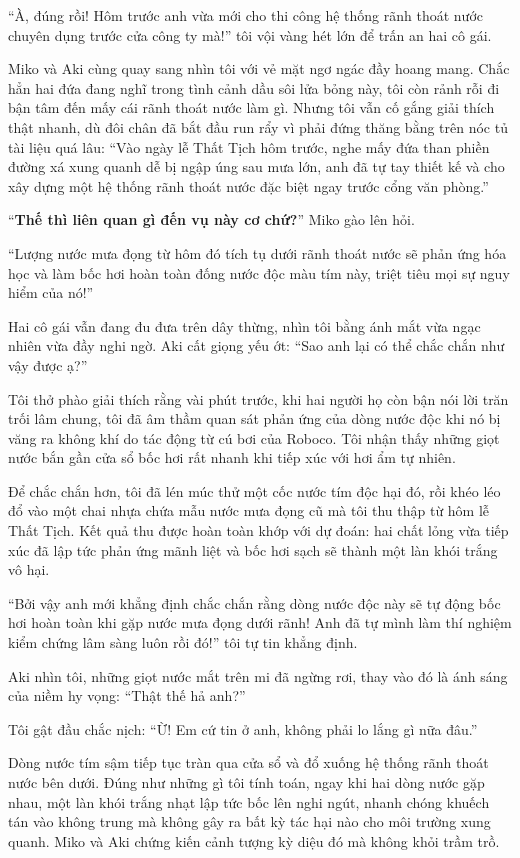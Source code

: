 \documentclass[../main.tex]{subfiles}
\begin{document}
``À, đúng rồi! Hôm trước anh vừa mới cho thi công hệ thống rãnh thoát nước chuyên dụng trước cửa công ty mà!'' tôi vội vàng hét lớn để trấn an hai cô gái.

Miko và Aki cùng quay sang nhìn tôi với vẻ mặt ngơ ngác đầy hoang mang. Chắc hẳn hai đứa đang nghĩ trong tình cảnh dầu sôi lửa bỏng này, tôi còn rảnh rỗi đi bận tâm đến mấy cái rãnh thoát nước làm gì. Nhưng tôi vẫn cố gắng giải thích thật nhanh, dù đôi chân đã bắt đầu run rẩy vì phải đứng thăng bằng trên nóc tủ tài liệu quá lâu:
``Vào ngày lễ Thất Tịch hôm trước, nghe mấy đứa than phiền đường xá xung quanh dễ bị ngập úng sau mưa lớn, anh đã tự tay thiết kế và cho xây dựng một hệ thống rãnh thoát nước đặc biệt ngay trước cổng văn phòng.''

``\textbf{Thế thì liên quan gì đến vụ này cơ chứ?}'' Miko gào lên hỏi.

``Lượng nước mưa đọng từ hôm đó tích tụ dưới rãnh thoát nước sẽ phản ứng hóa học và làm bốc hơi hoàn toàn đống nước độc màu tím này, triệt tiêu mọi sự nguy hiểm của nó!''

Hai cô gái vẫn đang đu đưa trên dây thừng, nhìn tôi bằng ánh mắt vừa ngạc nhiên vừa đầy nghi ngờ. Aki cất giọng yếu ớt:
``Sao anh lại có thể chắc chắn như vậy được ạ?''

Tôi thở phào giải thích rằng vài phút trước, khi hai người họ còn bận nói lời trăn trối lâm chung, tôi đã âm thầm quan sát phản ứng của dòng nước độc khi nó bị văng ra không khí do tác động từ cú bơi của Roboco. Tôi nhận thấy những giọt nước bắn gần cửa sổ bốc hơi rất nhanh khi tiếp xúc với hơi ẩm tự nhiên.

Để chắc chắn hơn, tôi đã lén múc thử một cốc nước tím độc hại đó, rồi khéo léo đổ vào một chai nhựa chứa mẫu nước mưa đọng cũ mà tôi thu thập từ hôm lễ Thất Tịch. Kết quả thu được hoàn toàn khớp với dự đoán: hai chất lỏng vừa tiếp xúc đã lập tức phản ứng mãnh liệt và bốc hơi sạch sẽ thành một làn khói trắng vô hại.

``Bởi vậy anh mới khẳng định chắc chắn rằng dòng nước độc này sẽ tự động bốc hơi hoàn toàn khi gặp nước mưa đọng dưới rãnh! Anh đã tự mình làm thí nghiệm kiểm chứng lâm sàng luôn rồi đó!'' tôi tự tin khẳng định.

Aki nhìn tôi, những giọt nước mắt trên mi đã ngừng rơi, thay vào đó là ánh sáng của niềm hy vọng:
``Thật thế hả anh?''

Tôi gật đầu chắc nịch:
``Ừ! Em cứ tin ở anh, không phải lo lắng gì nữa đâu.''

Dòng nước tím sậm tiếp tục tràn qua cửa sổ và đổ xuống hệ thống rãnh thoát nước bên dưới. Đúng như những gì tôi tính toán, ngay khi hai dòng nước gặp nhau, một làn khói trắng nhạt lập tức bốc lên nghi ngút, nhanh chóng khuếch tán vào không trung mà không gây ra bất kỳ tác hại nào cho môi trường xung quanh. Miko và Aki chứng kiến cảnh tượng kỳ diệu đó mà không khỏi trầm trồ.
\end{document}
